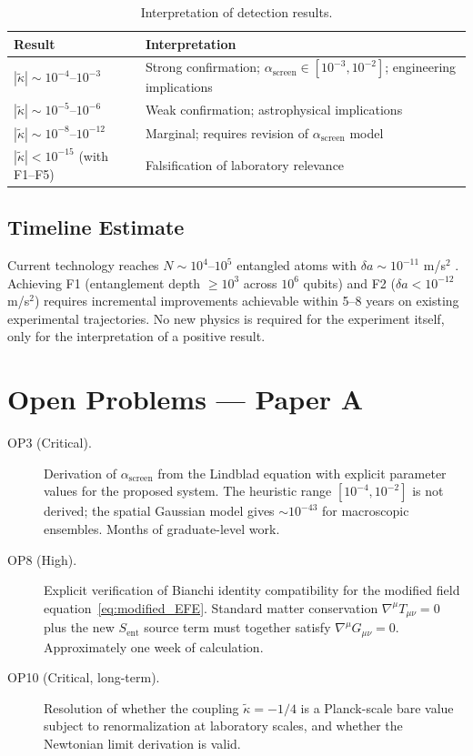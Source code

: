 \documentclass[12pt,letterpaper]{article}
\theoremstyle{plain}
\theoremstyle{definition}
\theoremstyle{remark}
\newcommand{\Sent}{S_{\mathrm{ent}}}
\newcommand{\ascreen}{\alpha_{\mathrm{screen}}}
\begin{document}
\begin{table}[H]
\centering
\caption{Interpretation of detection results.}
\renewcommand{\arraystretch}{1.25}
\begin{tabular}{@{}ll@{}}
\toprule
\textbf{Result} & \textbf{Interpretation} \\
\midrule
$|\tilde{\kappa}| \sim 10^{-4}$--$10^{-3}$ & Strong confirmation;
  $\ascreen \in[10^{-3},10^{-2}]$; engineering implications \\
$|\tilde{\kappa}| \sim 10^{-5}$--$10^{-6}$ & Weak confirmation;
  astrophysical implications \\
$|\tilde{\kappa}| \sim 10^{-8}$--$10^{-12}$ & Marginal;
  requires revision of $\ascreen$ model \\
$|\tilde{\kappa}| < 10^{-15}$ (with F1--F5) &
  Falsification of laboratory relevance \\
\bottomrule
\end{tabular}
\end{table}

\subsection{Timeline Estimate}

Current technology reaches $N \sim 10^4$--$10^5$ entangled atoms with
$\delta a \sim 10^{-11}$ m/s$^2$ \cite{asenbaum2020}. Achieving
F1 (entanglement depth $\geq 10^3$ across $10^6$ qubits) and F2
($\delta a < 10^{-12}$ m/s$^2$) requires incremental improvements
achievable within 5--8 years on existing experimental trajectories.
No new physics is required for the experiment itself, only for the
interpretation of a positive result.

\section*{Open Problems --- Paper A}

\begin{description}
  \item[OP3 (Critical).] Derivation of $\ascreen$ from the Lindblad
    equation with explicit parameter values for the proposed system.
    The heuristic range $[10^{-4},10^{-2}]$ is not derived; the
    spatial Gaussian model gives $\sim10^{-43}$ for macroscopic ensembles.
    Months of graduate-level work.
  \item[OP8 (High).] Explicit verification of Bianchi identity
    compatibility for the modified field equation~\eqref{eq:modified_EFE}.
    Standard matter conservation $\nabla^\mu T_{\mu\nu} = 0$ plus the
    new $\Sent$ source term must together satisfy $\nabla^\mu G_{\mu\nu}=0$.
    Approximately one week of calculation.
  \item[OP10 (Critical, long-term).] Resolution of whether the coupling
    $\tilde{\kappa}=-1/4$ is a Planck-scale bare value subject to
    renormalization at laboratory scales, and whether the Newtonian limit
    derivation is valid.
\end{description}
\end{document}
